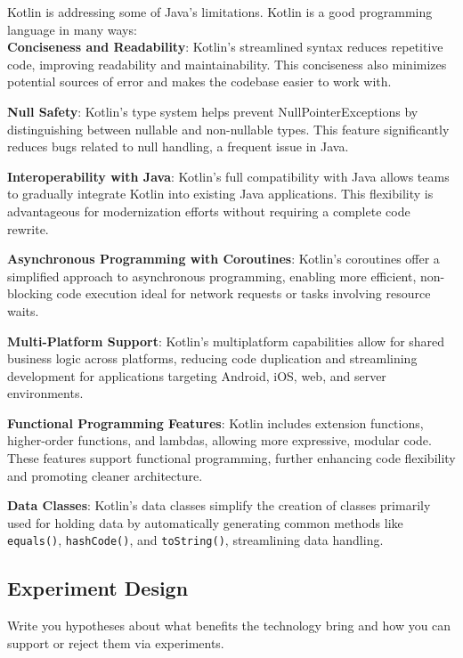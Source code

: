 Kotlin is addressing some of Java's limitations. Kotlin is a good programming language in many ways:
\\
\textbf{Conciseness and Readability}: Kotlin’s streamlined syntax reduces repetitive code, improving readability and maintainability. This conciseness also minimizes potential sources of error and makes the codebase easier to work with.

\textbf{Null Safety}: Kotlin’s type system helps prevent NullPointerExceptions by distinguishing between nullable and non-nullable types. This feature significantly reduces bugs related to null handling, a frequent issue in Java.

\textbf{Interoperability with Java}: Kotlin’s full compatibility with Java allows teams to gradually integrate Kotlin into existing Java applications. This flexibility is advantageous for modernization efforts without requiring a complete code rewrite.

\textbf{Asynchronous Programming with Coroutines}: Kotlin’s coroutines offer a simplified approach to asynchronous programming, enabling more efficient, non-blocking code execution ideal for network requests or tasks involving resource waits.

\textbf{Multi-Platform Support}: Kotlin’s multiplatform capabilities allow for shared business logic across platforms, reducing code duplication and streamlining development for applications targeting Android, iOS, web, and server environments.

\textbf{Functional Programming Features}: Kotlin includes extension functions, higher-order functions, and lambdas, allowing more expressive, modular code. These features support functional programming, further enhancing code flexibility and promoting cleaner architecture.

\textbf{Data Classes}: Kotlin’s data classes simplify the creation of classes primarily used for holding data by automatically generating common methods like \texttt{equals()}, \texttt{hashCode()}, and \texttt{toString()}, streamlining data handling.


\subsection{Experiment Design}

Write you hypotheses about what benefits the technology bring and how you can support or reject them via experiments.

\maketitle

